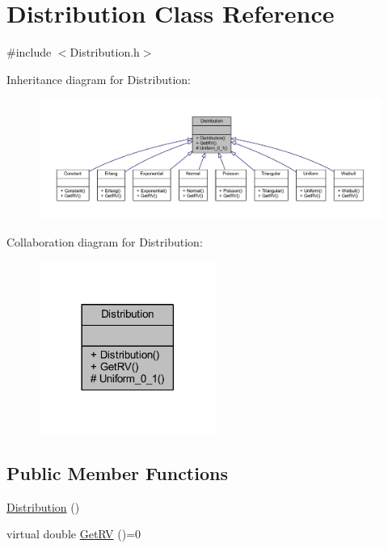 \hypertarget{class_distribution}{}\section{Distribution Class Reference}
\label{class_distribution}


{\ttfamily \#include $<$Distribution.\+h$>$}



Inheritance diagram for Distribution\+:\nopagebreak
\begin{figure}[H]
\begin{center}
\leavevmode
\includegraphics[width=350pt]{class_distribution__inherit__graph}
\end{center}
\end{figure}


Collaboration diagram for Distribution\+:\nopagebreak
\begin{figure}[H]
\begin{center}
\leavevmode
\includegraphics[width=165pt]{class_distribution__coll__graph}
\end{center}
\end{figure}
\subsection*{Public Member Functions}
\begin{DoxyCompactItemize}
\item 
\hyperlink{class_distribution_ada837c9a1da728290d6bbea0bb6b266f}{Distribution} ()
\item 
virtual double \hyperlink{class_distribution_a63b433850d7b47d84eb69448f7916719}{Get\+RV} ()=0
\end{DoxyCompactItemize}

